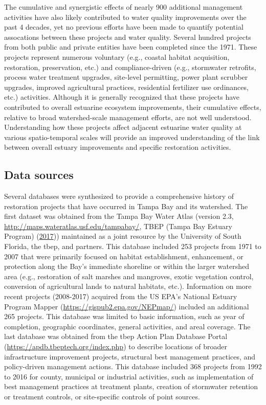 \documentclass[]{article}
\begin{document}
The cumulative and synergistic effects of nearly 900 additional
management activities have also likely contributed to water quality
improvements over the past 4 decades, yet no previous efforts have been
made to quantify potential assocations between these projects and water
quality. Several hundred projects from both public and private entities
have been completed since the 1971. These projects represent numerous
voluntary (e.g., coastal habitat acquisition, restoration, preservation,
etc.) and compliance-driven (e.g., stormwater retrofits, process water
treatment upgrades, site-level permitting, power plant scrubber
upgrades, improved agricultural practices, residential fertilizer use
ordinances, etc.) activities. Although it is generally recognized that
these projects have contributed to overall estuarine ecosystem
improvements, their cumulative effects, relative to broad
watershed-scale management efforts, are not well understood.
Understanding how these projects affect adjacent estuarine water quality
at various spatio-temporal scales will provide an improved understanding
of the link between overall estuary improvements and specific
restoration activities.

\hypertarget{data-sources}{%
\subsection{Data sources}\label{data-sources}}

Several databases were synthesized to provide a comprehensive history of
restoration projects that have occurred in Tampa Bay and its watershed.
The first dataset was obtained from the Tampa Bay Water Atlas (version
2.3, \url{http://maps.wateratlas.usf.edu/tampabay/}, TBEP (Tampa Bay
Estuary Program) (\protect\hyperlink{ref-TBEP17}{2017})) maintained as a
joint resource by the University of South Florida, the \ac{tbep}, and
partners. This database included 253 projects from 1971 to 2007 that
were primarily focused on habitat establishment, enhancement, or
protection along the Bay's immediate shoreline or within the larger
watershed area (e.g., restoration of salt marshes and mangroves, exotic
vegetation control, conversion of agricultural lands to natural
habitats, etc.). Information on more recent projects (2008-2017)
acquired from the US EPA's National Estuary Program Mapper
(\url{https://gispub2.epa.gov/NEPmap/}) included an additional 265
projects. This database was limited to basic information, such as year
of completion, geographic coordinates, general activities, and areal
coverage. The last database was obtained from the \ac{tbep} Action Plan
Database Portal (\url{https://apdb.tbeptech.org/index.php}) to describe
locations of broader infrastructure improvement projects, structural
best management practices, and policy-driven management actions. This
database included 368 projects from 1992 to 2016 for county, municipal
or industrial activities, such as implementation of best management
practices at treatment plants, creation of stormwater retention or
treatment controls, or site-specific controls of point sources.
\end{document}
